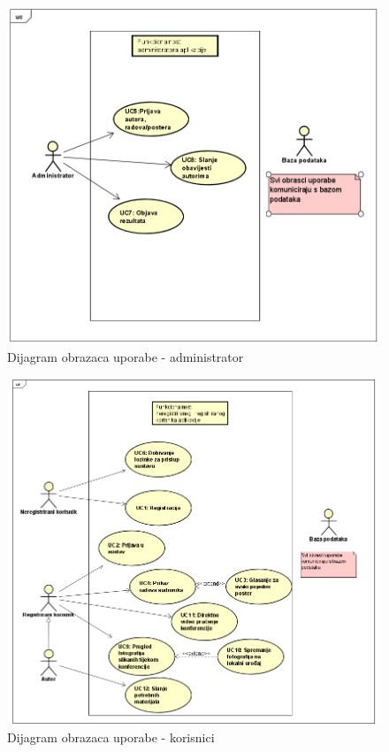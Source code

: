 					\begin{figure}[H]
						\includegraphics[scale=0.6]{slike/uc dijagram admin.PNG} %
						\centering
						\caption{Dijagram obrazaca uporabe - administrator}
						\label{fig:promjene}
					\end{figure}
					\begin{figure}[H]
						\includegraphics[scale=0.6]{slike/uc dijagram registrirani i neregistrirani korisnik.PNG} %
						\centering
						\caption{Dijagram obrazaca uporabe - korisnici}
						\label{fig:promjene2}
					\end{figure}
				\eject		
				
